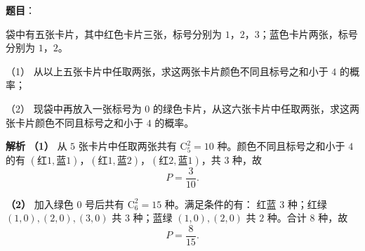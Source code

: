 \begin{answer}

\textbf{题目}：

袋中有五张卡片，其中红色卡片三张，标号分别为 $1$，$2$，$3$；蓝色卡片两张，标号分别为 $1$，$2$。

（1） 从以上五张卡片中任取两张，求这两张卡片颜色不同且标号之和小于 $4$ 的概率；

（2） 现袋中再放入一张标号为 $0$ 的绿色卡片，从这六张卡片中任取两张，求这两张卡片颜色不同且标号之和小于 $4$ 的概率。

\textbf{解析}
\textbf{（1）} 从 $5$ 张卡片中任取两张共有 $\mathrm C_5^2=10$ 种。颜色不同且标号之和小于 $4$ 的有 $(\text{红}1,\text{蓝}1)$，$(\text{红}1,\text{蓝}2)$，$(\text{红}2,\text{蓝}1)$，共 $3$ 种，故
\nopagebreak[4]
\[P=\frac3{10}.\]

\textbf{（2）} 加入绿色 $0$ 号后共有 $\mathrm C_6^2=15$ 种。满足条件的有：
红蓝 $3$ 种；红绿 $(1,0),(2,0),(3,0)$ 共 $3$ 种；蓝绿 $(1,0),(2,0)$ 共 $2$ 种。合计 $8$ 种，故
\nopagebreak[4]
\[P=\frac8{15}.\]



\end{answer}
